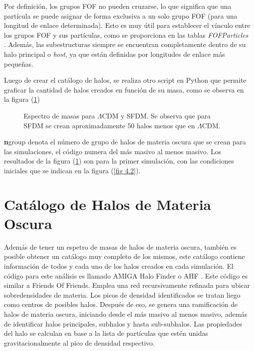 \documentclass[a4paper,openright,12pt]{book}
\begin{document}
Por definición, los grupos FOF no pueden cruzarse, lo que significa que una partícula se puede asignar de forma exclusiva a un solo grupo FOF (para una longitud de enlace determinada). Esto es muy útil para establecer el vínculo entre los grupos FOF y sus partículas, como se proporciona en las tablas \textit{FOFParticles} . Además, las subestructuras siempre se encuentran completamente dentro de su halo principal o \textit{host}, ya que están definidas por longitudes de enlace más pequeñas.

Luego de crear el catálogo de halos, se realiza otro script en Python que permite graficar la cantidad de halos creados en función de su masa,  como se observa en la figura (\ref{fig 4.4})
\begin{figure}[htpb]
\centering
{}
\caption{\footnotesize{Espectro de masas para $\Lambda$CDM y SFDM. Se observa que para SFDM se crean aproximadamente 50 halos menos que en $\Lambda$CDM.}} \label{fig 4.4}
\end{figure}

\textbf{n}group denota el número de grupo de halos de materia oscura que se crean para las simulaciones, el código numera del más masivo al menos masivo. Los resultados de la figura (\ref{fig 4.4}) son para la primer simulación, con las condiciones iniciales que se indican en la figura (\ref{fig 4.2}). 

\section{Catálogo de Halos de Materia Oscura}
Además de tener un espetro de masas de halos de materia oscura, también es posible obtener un catálogo muy completo de los mismos, este catálogo contiene información de todos y cada uno de los halos creados en cada simulación. El código para este análisis es llamado AMIGA Halo Finder o AHF \cite{4.5}. Este código es similar a Friends Of Friends. Emplea una red recursivamente refinada para ubicar sobredensidades de materia. Los picos de densidad identificados se tratan liego como centros de posibles halos. Después de eso, se genera una ramificación de halos de materia oscura, iniciando desde el más masivo al menos masivo, además de identificar halos principales, subhalos  y hasta sub-subhalos. Las propiedades del halo se calculan en base a la lista de partículas que estén unidas gravitacionalmente al pico de densidad respectivo. 
\end{document}
